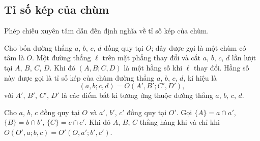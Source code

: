     \subsection{Tỉ số kép của chùm}

        Phép chiếu xuyên tâm dẫn đến định nghĩa về tỉ số kép của chùm.

        \begin{definition}
            Cho bốn đường thẳng \(a\), \(b\), \(c\), \(d\) đồng quy tại \(O\); đây được gọi là một chùm có tâm là \(O\). Một đường thẳng \(\ell\) trên mặt phẳng thay đổi và cắt \(a\), \(b\), \(c\), \(d\) lần lượt tại \(A\), \(B\), \(C\), \(D\). Khi đó \((A,B;C,D)\) là một hằng số khi \(\ell\) thay đổi. Hằng số này được gọi là tỉ số kép của chùm đường thẳng \(a\), \(b\), \(c\), \(d\), kí hiệu là
            \[(a,b;c,d) = O(A',B';C',D'),\]
            với \(A'\), \(B'\), \(C'\), \(D'\) là các điểm bất kì tương ứng thuộc đường thẳng \(a\), \(b\), \(c\), \(d\). 
        \end{definition}

        \begin{theorem}
            Cho \(a\), \(b\), \(c\) đồng quy tại \(O\) và \(a'\), \(b'\), \(c'\) đồng quy tại \(O'\). Gọi \(\{A\} = a \cap a'\), \(\{B\} = b \cap b'\), \(\{C\} = c \cap c'\). Khi đó \(A\), \(B\), \(C\) thẳng hàng khi và chỉ khi \(O(O',a;b,c) = O'(O,a';b',c')\).
        \end{theorem}

